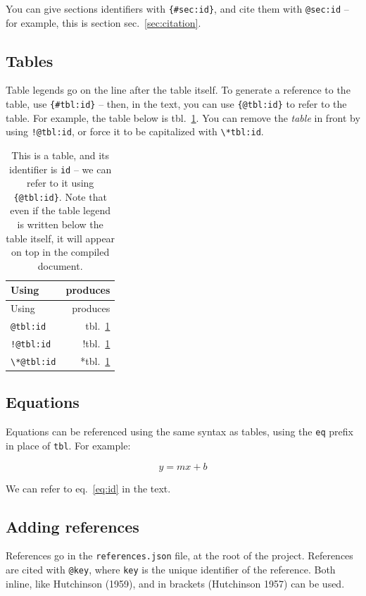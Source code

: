 \documentclass[12pt]{article}
\begin{document}
You can give sections identifiers with \lstinline!{#sec:id}!, and cite
them with \lstinline!@sec:id! -- for example, this is section
sec.~\ref{sec:citation}.

\subsection{Tables}\label{tables}

Table legends go on the line after the table itself. To generate a
reference to the table, use \lstinline!{#tbl:id}! -- then, in the text,
you can use \lstinline!{@tbl:id}! to refer to the table. For example,
the table below is tbl.~\ref{tbl:id}. You can remove the \emph{table} in
front by using \lstinline"!@tbl:id", or force it to be capitalized with
\lstinline!\*tbl:id!.

\hypertarget{tbl:id}{}
\begin{longtable}[]{@{}lr@{}}
\caption{\label{tbl:id}This is a table, and its identifier is
\lstinline!id! -- we can refer to it using \lstinline!{@tbl:id}!. Note
that even if the table legend is written below the table itself, it will
appear on top in the compiled document. }\tabularnewline
\toprule
Using & produces\tabularnewline
\midrule
\endfirsthead
\toprule
Using & produces\tabularnewline
\midrule
\endhead
\lstinline!@tbl:id! & tbl.~\ref{tbl:id}\tabularnewline
\lstinline"!@tbl:id" & !tbl.~\ref{tbl:id}\tabularnewline
\lstinline!\*@tbl:id! & *tbl.~\ref{tbl:id}\tabularnewline
\bottomrule
\end{longtable}

\subsection{Equations}\label{equations}

Equations can be referenced using the same syntax as tables, using the
\lstinline!eq! prefix in place of \lstinline!tbl!. For example:

\begin{equation} y = mx + b \label{eq:id}\end{equation}

We can refer to eq.~\ref{eq:id} in the text.

\subsection{Adding references}\label{adding-references}

References go in the \lstinline!references.json! file, at the root of
the project. References are cited with \lstinline!@key!, where
\lstinline!key! is the unique identifier of the reference. Both inline,
like Hutchinson (1959), and in brackets (Hutchinson 1957) can be used.
\end{document}
